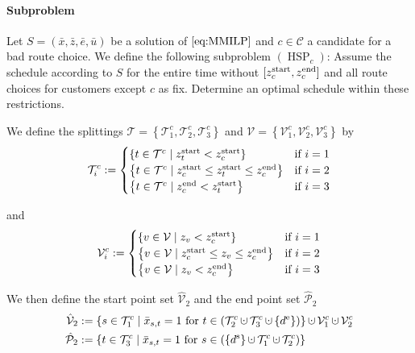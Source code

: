 \paragraph{Subproblem} \parfill

Let $S=\left(\bar{x},\bar{z},\bar{e},\bar{u}\right)$ be a solution of $\eqref{eq:MMILP}$ and $c\in\mathcal{C}$ a candidate for a bad route choice. We define the following subproblem $(\operatorname{HSP}_c)$: Assume the schedule according to $S$ for the entire time without $[z^{\operatorname{start}}_c,z^{\operatorname{end}}_c]$ and all route choices for customers except $c$ as fix. Determine an optimal schedule within these restrictions.

We define the splittings $\mathcal{T}=\left\{\mathcal{T}^c_1,\mathcal{T}^c_2,\mathcal{T}^c_3\right\}$ and $\mathcal{V}=\left\{\mathcal{V}^c_1,\mathcal{V}^c_2,\mathcal{V}^c_3\right\}$ by
\begin{align*}
	\mathcal{T}^c_i := \begin{cases}
		\left\{t\in\mathcal{T}^c\mid z^{\operatorname{start}}_t<z^{\operatorname{start}}_c\right\} & \text{if } i=1 \\
		\left\{t\in\mathcal{T}^c\mid z^{\operatorname{start}}_c\leq z^{\operatorname{start}}_t\leq z^{\operatorname{end}}_c\right\} & \text{if } i=2 \\
		\left\{t\in\mathcal{T}^c\mid z^{\operatorname{end}}_c<z^{\operatorname{start}}_t\right\} & \text{if } i=3
	\end{cases}
\end{align*}

and
\begin{align*}
	\mathcal{V}^c_i := \begin{cases}
		\left\{v\in\mathcal{V}\mid z_v<z^{\operatorname{start}}_c\right\} & \text{if } i=1 \\
		\left\{v\in\mathcal{V}\mid z^{\operatorname{start}}_c\leq z_v\leq z^{\operatorname{end}}_c\right\} & \text{if } i=2 \\
		\left\{v\in\mathcal{V}\mid z_v<z^{\operatorname{end}}_c\right\} & \text{if } i=3
	\end{cases}
\end{align*}

We then define the start point set $\hat{\mathcal{V}}_2$ and the end point set $\hat{\mathcal{P}}_2$
\begin{align*}
	\hat{\mathcal{V}}_2 & := \left\{s\in\mathcal{T}^c_1\mid \bar{x}_{s,t}=1\text{ for }t\in\left(\mathcal{T}^c_2\cupdot\mathcal{T}^c_3\cupdot\left\{\de\right\}\right)\right\}\cupdot\mathcal{V}^c_1\cupdot\mathcal{V}^c_2 \\
	\hat{\mathcal{P}}_2 & := \left\{t\in\mathcal{T}^c_3\mid \bar{x}_{s,t}=1\text{ for }s\in\left(\left\{\ds\right\}\cupdot\mathcal{T}^c_1\cupdot\mathcal{T}^c_2\right)\right\}
\end{align*}

